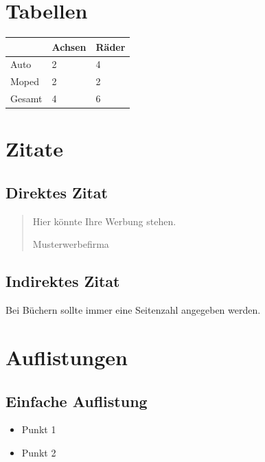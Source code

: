 \section{Tabellen}
\begin{table}[h]
    \centering
    \renewcommand*{\arraystretch}{1.5}
    \begin{tabular}{|l|l|l|}
        \hline
               & Achsen & Räder \\ \hline
        Auto   & 2      & 4     \\ \hline
        Moped  & 2~     & 2~    \\ \hline\hline
        Gesamt & 4      & 6     \\ \hline
    \end{tabular}
    \label{tab:example-table}
\end{table}

\section{Zitate}

\subsection{Direktes Zitat}
\begin{quote}
    \glqq Hier könnte Ihre Werbung stehen.\grqq
    \begin{flushright}
        Musterwerbefirma~\cite{web}
    \end{flushright}
\end{quote}

\subsection{Indirektes Zitat}
Bei Büchern sollte immer eine Seitenzahl angegeben werden. \cite[S.~1]{book}

\section{Auflistungen}

\subsection{Einfache Auflistung}
\begin{itemize}
    \item Punkt 1
    \item Punkt 2
\end{itemize}

